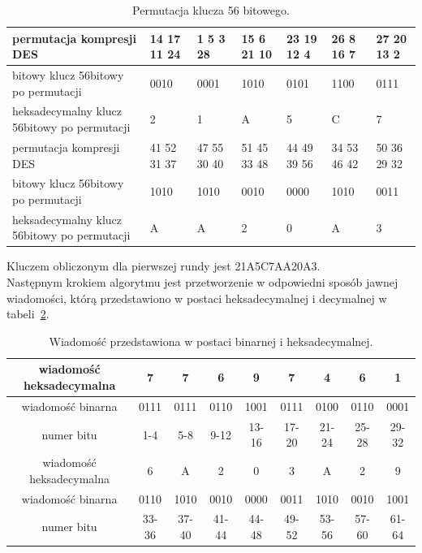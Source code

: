 \documentclass[12p]{article}
\begin{document}
\begin{table}[H]
\centering
\begin{tabular}{ | p{3cm} | p{1.7cm} | p{1.7cm} | p{1.7cm} | p{1.7cm} | p{1.7cm} | p{1.7cm} |}
\hline
permutacja kompresji DES & 14 17 11 24  & 1 5 3 28 &  15 6 21 10 & 23  19 12 4 & 26 8 16 7 & 27 20 13 2\\ \hline
bitowy klucz 56bitowy po permutacji & 0010 & 0001 & 1010 & 0101 & 1100 & 0111 \\ \hline
heksadecymalny klucz 56bitowy po permutacji & 2 & 1 & A & 5 & C & 7\\
\hline \hline
permutacja kompresji DES & 41 52 31 37 & 47 55 30 40 & 51 45 33 48 & 44 49 39 56 & 34 53 46 42 & 50 36 29 32\\ \hline
bitowy klucz 56bitowy po permutacji & 1010 & 1010 & 0010 & 0000 & 1010 & 0011\\ \hline
heksadecymalny klucz 56bitowy po permutacji & A & A & 2 & 0 & A & 3\\ 
\hline
\end{tabular}
\caption{Permutacja klucza 56 bitowego.}\label{56}
\end{table}

Kluczem obliczonym dla pierwszej rundy jest 21A5C7AA20A3.\\


Następnym krokiem algorytmu jest przetworzenie w odpowiedni sposób jawnej wiadomości, którą przedstawiono w postaci heksadecymalnej i decymalnej w tabeli~\ref{wiadomosc}.

\begin{table}[H]
\centering
\begin{tabular}{|c|c|c|c|c|c|c|c|c|}
\hline
wiadomość heksadecymalna & 7 & 7 & 6 & 9 & 7 & 4 & 6 & 1\\ \hline
wiadomość binarna & 0111 & 0111 & 0110 & 1001 & 0111 & 0100 & 0110 & 0001\\ \hline
numer bitu & 1-4 & 5-8 & 9-12 & 13-16 & 17-20 & 21-24 & 25-28 & 29-32\\ \hline
wiadomość heksadecymalna & 6 & A & 2 & 0 & 3 & A & 2 & 9\\ \hline
wiadomość binarna & 0110 & 1010 & 0010 & 0000 & 0011 & 1010 & 0010 & 1001\\ \hline
numer bitu & 33-36 & 37-40 & 41-44 & 44-48 & 49-52 & 53-56 & 57-60 & 61-64\\ \hline
\end{tabular}
\caption{Wiadomość przedstawiona w postaci binarnej i heksadecymalnej.}\label{wiadomosc}
\end{table}
\end{document}
